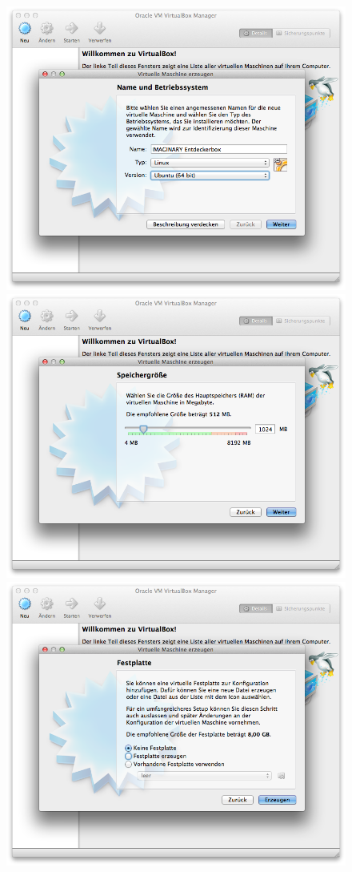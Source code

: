 \documentclass[a4paper,10pt,BCOR=0mm,DIV=14]{scrartcl}
\def\gfxscale{0.27}
\begin{document}
\begin{figure}[h]
\centering
\includegraphics[scale=\gfxscale]{VBox20_de_DE}
\qquad
\includegraphics[scale=\gfxscale]{VBox30_de_DE}
\\[\bigskipamount]
\includegraphics[scale=\gfxscale]{VBox40_de_DE}

\end{figure}
\end{document}
